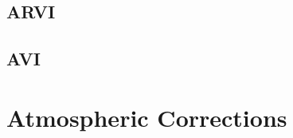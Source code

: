 \subsection{ARVI}
\label{secARVI}


\subsection{AVI}
\label{secAVI}



\section{Atmospheric Corrections}
\label{secAtmosphericCorrections}

